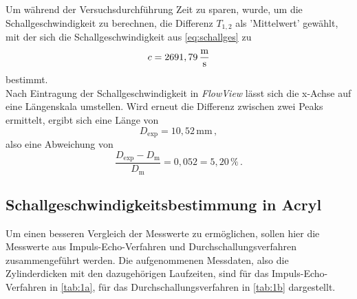 Um während der Versuchsdurchführung Zeit zu sparen, wurde, um die Schallgeschwindigkeit zu berechnen, die Differenz $T_{1,2}$ als 'Mittelwert' gewählt,
mit der sich die Schallgeschwindigkeit aus \eqref{eq:schallges} zu
\begin{equation*}
    c = 2691,79 \,\unit{\frac{\meter}{\second}}
\end{equation*}
bestimmt. \\

Nach Eintragung der Schallgeschwindigkeit in \textit{FlowView} lässt sich die x-Achse auf eine Längenskala umstellen.
Wird erneut die Differenz zwischen zwei Peaks ermittelt, ergibt sich eine Länge von
\begin{equation*}
    D_\text{exp} = 10,52 \, \unit{\milli\meter} \,,
\end{equation*}
also eine Abweichung von
\begin{equation*}
    \frac{D_\text{exp}-D_\text{m}}{D_\text{m}} = 0,052 = 5,20 \,\% \,.
\end{equation*}


\subsection{Schallgeschwindigkeitsbestimmung in Acryl}

Um einen besseren Vergleich der Messwerte zu ermöglichen, sollen hier die Messwerte aus Impuls-Echo-Verfahren und Durchschallungsverfahren zusammengeführt werden.
Die aufgenommenen Messdaten, also die Zylinderdicken mit den dazugehörigen Laufzeiten, sind für das Impuls-Echo-Verfahren in \autoref{tab:1a}, für das Durchschallungsverfahren in \autoref{tab:1b} dargestellt.

